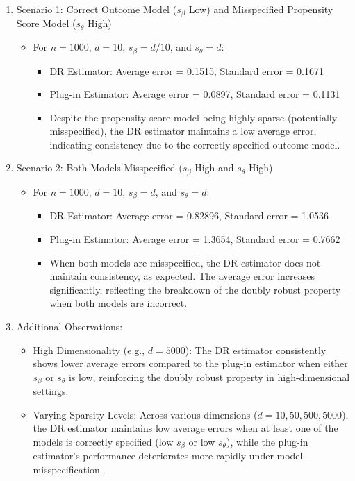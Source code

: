 \documentclass{article}
\begin{document}
\begin{enumerate}
  \item Scenario 1: Correct Outcome Model (\( s_\beta \) Low) and Misspecified Propensity Score Model (\( s_\theta \) High)
    \begin{itemize}
      \item For \( n = 1000 \), \( d = 10 \), \( s_\beta = d/10 \), and \( s_\theta = d \):
        \begin{itemize}
          \item DR Estimator: Average error = 0.1515, Standard error = 0.1671
          \item Plug-in Estimator: Average error = 0.0897, Standard error = 0.1131
          \item Despite the propensity score model being highly sparse (potentially misspecified), the DR estimator maintains a low average error, indicating consistency due to the correctly specified outcome model.
        \end{itemize}
    \end{itemize}

  \item Scenario 2: Both Models Misspecified (\( s_\beta \) High and \( s_\theta \) High)
    \begin{itemize}
      \item For \( n = 1000 \), \( d = 10 \), \( s_\beta = d \), and \( s_\theta = d \):
        \begin{itemize}
          \item DR Estimator: Average error = 0.82896, Standard error = 1.0536
          \item Plug-in Estimator: Average error = 1.3654, Standard error = 0.7662
          \item When both models are misspecified, the DR estimator does not maintain consistency, as expected. The average error increases significantly, reflecting the breakdown of the doubly robust property when both models are incorrect.
        \end{itemize}
    \end{itemize}

  \item Additional Observations:
    \begin{itemize}
      \item High Dimensionality (e.g., \( d = 5000 \)): The DR estimator consistently shows lower average errors compared to the plug-in estimator when either \( s_\beta \) or \( s_\theta \) is low, reinforcing the doubly robust property in high-dimensional settings.
      \item Varying Sparsity Levels: Across various dimensions (\( d = 10, 50, 500, 5000 \)), the DR estimator maintains low average errors when at least one of the models is correctly specified (low \( s_\beta \) or low \( s_\theta \)), while the plug-in estimator's performance deteriorates more rapidly under model misspecification.
    \end{itemize}
\end{enumerate}
\end{document}
